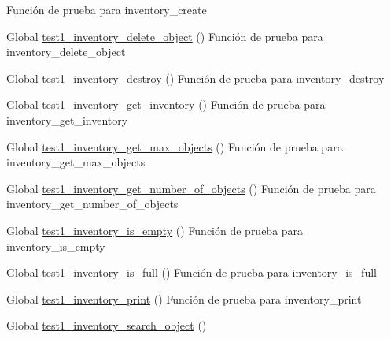 \begin{DoxyRefList}
%
Función de prueba para inventory\+\_\+create  
\item[Global \mbox{\hyperlink{inventory__test_8c_af6ad6f6d577b5f123f36351139c6d918}{test1\+\_\+inventory\+\_\+delete\+\_\+object}} ()]\label{test__test000056}%
%
Función de prueba para inventory\+\_\+delete\+\_\+object  
\item[Global \mbox{\hyperlink{inventory__test_8c_ab161eafe6a61db39b2237e97c677d822}{test1\+\_\+inventory\+\_\+destroy}} ()]\label{test__test000043}%
%
Función de prueba para inventory\+\_\+destroy  
\item[Global \mbox{\hyperlink{inventory__test_8c_a4fabef11aa72defe00459c078ae42af4}{test1\+\_\+inventory\+\_\+get\+\_\+inventory}} ()]\label{test__test000051}%
%
Función de prueba para inventory\+\_\+get\+\_\+inventory  
\item[Global \mbox{\hyperlink{inventory__test_8c_a17c5d7d6ecb4161696deca0155e13f4f}{test1\+\_\+inventory\+\_\+get\+\_\+max\+\_\+objects}} ()]\label{test__test000075}%
%
Función de prueba para inventory\+\_\+get\+\_\+max\+\_\+objects  
\item[Global \mbox{\hyperlink{inventory__test_8c_a8ae9f8ddebed8f6dfcda767c1715076d}{test1\+\_\+inventory\+\_\+get\+\_\+number\+\_\+of\+\_\+objects}} ()]\label{test__test000049}%
%
Función de prueba para inventory\+\_\+get\+\_\+number\+\_\+of\+\_\+objects  
\item[Global \mbox{\hyperlink{inventory__test_8c_afe8c9730e30b58535afc0481970ab2b1}{test1\+\_\+inventory\+\_\+is\+\_\+empty}} ()]\label{test__test000061}%
%
Función de prueba para inventory\+\_\+is\+\_\+empty  
\item[Global \mbox{\hyperlink{inventory__test_8c_a7eb3ba387e33c42ff45331c9d9aada34}{test1\+\_\+inventory\+\_\+is\+\_\+full}} ()]\label{test__test000064}%
%
Función de prueba para inventory\+\_\+is\+\_\+full  
\item[Global \mbox{\hyperlink{inventory__test_8c_a7229ceb1916b0da955d23598da89d5ea}{test1\+\_\+inventory\+\_\+print}} ()]\label{test__test000053}%
%
Función de prueba para inventory\+\_\+print  
\item[Global \mbox{\hyperlink{inventory__test_8c_a72641d8b12c0f08ec4aa3590517797e4}{test1\+\_\+inventory\+\_\+search\+\_\+object}} ()]\label{test__test000067}%
%

\end{DoxyRefList}
